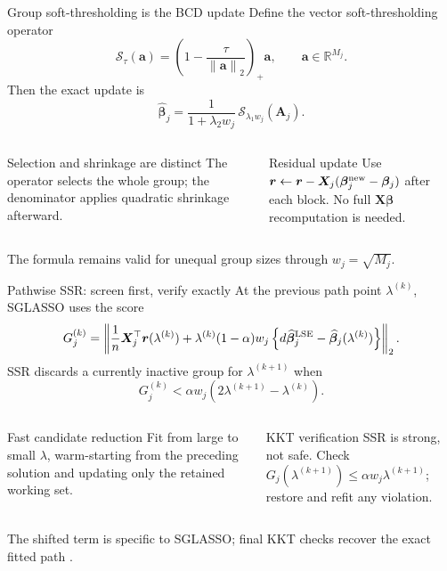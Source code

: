 \documentclass[newPxFont,nosectionpage]{beamer}
\newcommand{\bbeta}{\bm{\beta}}
\newcommand{\bX}{\bm{X}}
\newcommand{\bA}{\bm{A}}
\newcommand{\bbr}{\bm{r}}
\newcommand{\ba}{\bm{a}}
\newcommand{\norm}[1]{\left\lVert #1 \right\rVert}
\newcommand{\soft}[2]{\mathcal{S}_{#1}\!\left(#2\right)}
\begin{document}
\begin{frame}{Group soft-thresholding is the BCD update}
\footnotesize
Define the vector soft-thresholding operator
\[
  \soft{\tau}{\ba}=
  \left(1-\frac{\tau}{\norm{\ba}_2}\right)_+\ba,
  \qquad \ba\in\mathbb{R}^{M_j}.
\]
Then the exact update is
\[
  \widehat{\bbeta}_j=
  \frac{1}{1+\lambda_2w_j}\,
  \soft{\lambda_1w_j}{\bA_j}.
\]
\begin{columns}[T,onlytextwidth]
\begin{block}{Selection and shrinkage are distinct}
The operator selects the whole group; the denominator applies quadratic shrinkage afterward.
\end{block}
\begin{block}{Residual update}
Use $\bbr\leftarrow\bbr-\bX_j(\bbeta_j^{\rm new}-\bbeta_j)$ after each block. No full $\bX\bbeta$ recomputation is needed.
\end{block}
\end{columns}
\vspace{0.35em}
\scriptsize The formula remains valid for unequal group sizes through $w_j=\sqrt{M_j}$.
\end{frame}

\begin{frame}{Pathwise SSR: screen first, verify exactly}
\scriptsize
At the previous path point $\lambda^{(k)}$, SGLASSO uses the score
\[
G_j^{(k)}=\left\lVert
\frac{1}{n}\bX_j^\top\bbr(\lambda^{(k)})+
\lambda^{(k)}(1-\alpha)w_j
\left\{d\widehat{\bbeta}^{\rm LSE}_j-\widehat{\bbeta}_j(\lambda^{(k)})\right\}
\right\rVert_2.
\]
SSR discards a currently inactive group for $\lambda^{(k+1)}$ when
\[
  G_j^{(k)}<\alpha w_j\left(2\lambda^{(k+1)}-\lambda^{(k)}\right).
\]
\begin{columns}[T,onlytextwidth]
\begin{block}{Fast candidate reduction}
Fit from large to small $\lambda$, warm-starting from the preceding solution and updating only the retained working set.
\end{block}
\begin{block}{KKT verification}
SSR is strong, not safe. Check $G_j(\lambda^{(k+1)})\leq\alpha w_j\lambda^{(k+1)}$; restore and refit any violation.
\end{block}
\end{columns}
\vspace{0.2em}
\scriptsize The shifted term is specific to SGLASSO; final KKT checks recover the exact fitted path \citep{friedman2007pathwise,tibshirani2012strong}.
\end{frame}
\end{document}

